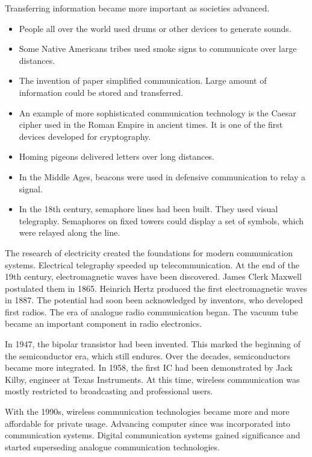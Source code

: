 Transferring information became more important as societies advanced.
\begin{itemize}
	\item People all over the world used drums or other devices to generate sounds.
	\item Some Native Americans tribes used smoke signs to communicate over large distances.
	\item The invention of paper simplified communication. Large amount of information could be stored and transferred.
	\item An example of more sophisticated communication technology is the Caesar cipher used in the Roman Empire in ancient times. It is one of the first devices developed for cryptography.
	\item Homing pigeons delivered letters over long distances.
	\item In the Middle Ages, beacons were used in defensive communication to relay a signal.
	\item In the 18th century, semaphore lines had been built. They used visual telegraphy. Semaphores on fixed towers could display a set of symbols, which were relayed along the line.
\end{itemize}



The research of electricity created the foundations for modern communication systems. Electrical telegraphy speeded up telecommunication. At the end of the 19th century, electromagnetic waves have been discovered. James Clerk Maxwell postulated them in 1865. Heinrich Hertz produced the first electromagnetic waves in 1887. The potential had soon been acknowledged by inventors, who developed first radios. The era of analogue radio communication began. The vacuum tube became an important component in radio electronics.

In 1947, the bipolar transistor had been invented. This marked the beginning of the semiconductor era, which still endures. Over the decades, semiconductors became more integrated. In 1958, the first \ac{IC} had been demonstrated by Jack Kilby, engineer at Texas Instruments. At this time, wireless communication was mostly restricted to broadcasting and professional users.

With the 1990s, wireless communication technologies became more and more affordable for private usage. Advancing computer since was incorporated into communication systems. Digital communication systems gained significance and started superseding analogue communication technologies.

